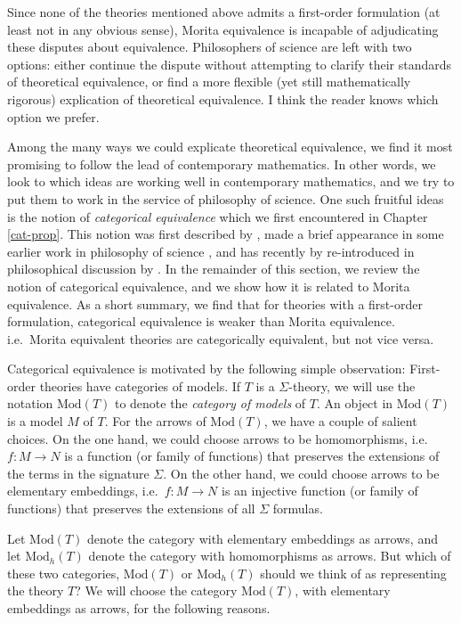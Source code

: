 Since none of the theories mentioned above admits a first-order
formulation (at least not in any obvious sense), Morita equivalence is
incapable of adjudicating these disputes about equivalence.
Philosophers of science are left with two options: either continue the
dispute without attempting to clarify their standards of theoretical
equivalence, or find a more flexible (yet still mathematically
rigorous) explication of theoretical equivalence.  I think the reader
knows which option we prefer.

Among the many ways we could explicate theoretical equivalence, we
find it most promising to follow the lead of contemporary mathematics.
In other words, we look to which ideas are working well in
contemporary mathematics, and we try to put them to work in the
service of philosophy of science.  One such fruitful ideas is the
notion of \emph{categorical equivalence} which we first encountered in
Chapter \ref{cat-prop}.  This notion was first described by
\cite{eilenbergmaclane1942,eilenbergmaclane1945}, made a brief
appearance in some earlier work in philosophy of science
\citep{pearce}, and has recently by re-introduced in philosophical
discussion by \cite{halvorson2012,halvorson-ox,weatherall-erk}. In the
remainder of this section, we review the notion of categorical
equivalence, and we show how it is related to Morita equivalence.  As
a short summary, we find that for theories with a first-order
formulation, categorical equivalence is weaker than Morita
equivalence.  i.e.\ Morita equivalent theories are categorically
equivalent, but not vice versa.

Categorical equivalence is motivated by the following simple
observation: First-order theories have categories of models.  If $T$
is a $\Sigma$-theory, we will use the notation $\text{Mod}(T)$ to
denote the \emph{category of models} of $T$. An object in
$\text{Mod}(T)$ is a model $M$ of $T$.  For the arrows of
$\mathrm{Mod}(T)$, we have a couple of salient choices.  On the one
hand, we could choose arrows to be homomorphisms, i.e.\ $f:M\to N$ is
a function (or family of functions) that preserves the extensions of
the terms in the signature $\Sigma$.  On the other hand, we could
choose arrows to be elementary embeddings, i.e.\ $f:M\to N$ is an
injective function (or family of functions) that preserves the
extensions of all $\Sigma$ formulas.

Let $\mathrm{Mod}(T)$ denote the category with elementary embeddings
as arrows, and let $\mathrm{Mod}_h(T)$ denote the category with
homomorphisms as arrows.  But which of these two categories,
$\mathrm{Mod}(T)$ or $\mathrm{Mod}_h(T)$ should we think of as
representing the theory $T$?  We will choose the category
$\mathrm{Mod}(T)$, with elementary embeddings as arrows, for the
following reasons.

